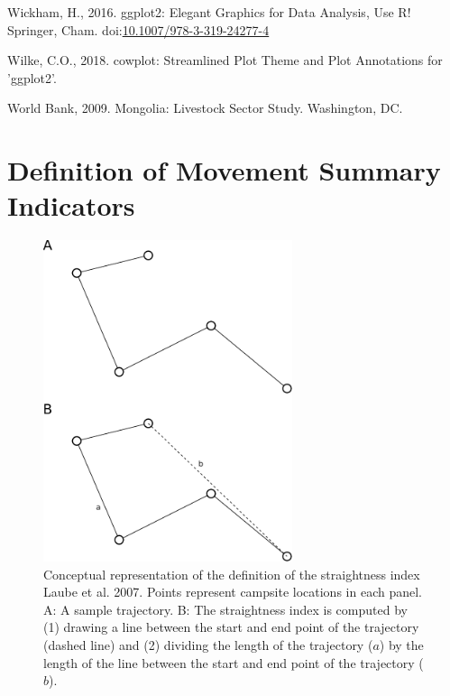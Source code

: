 \documentclass[]{elsarticle} %
\newlength{\cslhangindent}
\newenvironment{cslreferences}%
  {\setlength{\parindent}{0pt}%
  \everypar{\setlength{\hangindent}{\cslhangindent}}\ignorespaces}%
  {\par}
\begin{document}
\begin{cslreferences}
\leavevmode\hypertarget{ref-Wickham.2016}{}%
Wickham, H., 2016. ggplot2: Elegant Graphics for Data Analysis, Use R!
Springer, Cham.
doi:\href{https://doi.org/10.1007/978-3-319-24277-4}{10.1007/978-3-319-24277-4}

\leavevmode\hypertarget{ref-Wilke.2018}{}%
Wilke, C.O., 2018. cowplot: Streamlined Plot Theme and Plot Annotations
for 'ggplot2'.

\leavevmode\hypertarget{ref-WorldBank.2009}{}%
World Bank, 2009. Mongolia: Livestock Sector Study. Washington, DC.
\end{cslreferences}

\clearpage

\appendix

\hypertarget{definition-of-movement-summary-indicators}{%
\section{Definition of Movement Summary
Indicators}\label{definition-of-movement-summary-indicators}}

\begin{figure}[H]

{\centering \includegraphics[width=0.65\textwidth]{./../figures/si_definition_straighntess_index} 

}

\caption{Conceptual representation of the definition of the straightness index Laube et al. 2007. Points represent campsite locations in each panel. A: A sample trajectory. B: The straightness index is computed by (1) drawing a line between the start and end point of the trajectory (dashed line) and (2) dividing the length of the trajectory ($a$) by the length of the line between the start and end point of the trajectory ($b$).}\label{fig:appendix-definition-straightness-index}
\end{figure}
\end{document}
